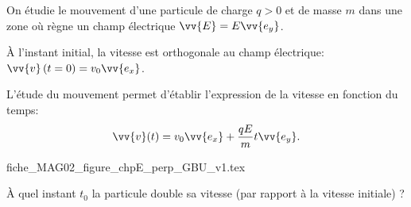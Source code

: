 \debutEntrainement




                                \initialisationPartieGauche %
\smallskip
On étudie le mouvement d'une particule de charge $q>0$ et de masse $m$ dans une zone où règne un champ électrique $\vv{E}=E\vv{e_{y}}$.

À l'instant initial, la vitesse est orthogonale au champ électrique: $\vv{v}\left(t=0\right)=v_{0}\vv{e_{x}}$.

L'étude du mouvement permet d'établir l'expression de la vitesse en fonction du temps:
\[
\vv{v}(t)=v_{0}\vv{e_{x}}+\dfrac{qE}{m}t\vv{e_{y}}.
\]



                                \initialisationPartieDroite %
\begin{center}
{fiche_MAG02_figure_chpE_perp_GBU_v1.tex}
\end{center}
                               \finalisationDuPartageDePage %



\begin{enonce}
À quel instant $t_0$ la particule double sa vitesse (par rapport à la vitesse initiale) ?
\end{enonce}


